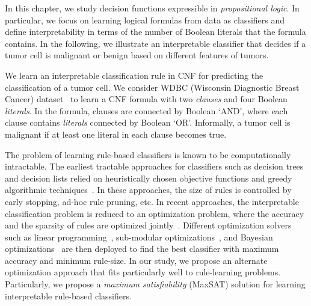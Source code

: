 In this chapter, we study decision functions expressible in \emph{propositional logic}. In particular, we focus on learning logical formulas from data as classifiers and define interpretability in terms of the number of Boolean literals that the formula contains. In the following, we illustrate an interpretable classifier that decides if a tumor cell is malignant or benign based on different features of tumors.

\vspace{1em}
\vspace{1em}


\begin{example}
	\normalfont
	We learn an interpretable classification rule in CNF for predicting the classification of a tumor cell. We consider WDBC (Wisconsin Diagnostic Breast Cancer) dataset~\cite{agarap2018breast} to learn a CNF formula with two \emph{clauses} and four Boolean \emph{literals}. In the formula, clauses are connected by Boolean `AND', where each clause contains \emph{literals} connected by Boolean `OR'. Informally, a tumor cell is malignant if at least one literal in each clause becomes true.
\end{example}



The problem of learning rule-based classifiers is known to be computationally intractable. The earliest tractable approaches for classifiers such as decision trees and decision lists relied on heuristically chosen objective functions and greedy algorithmic techniques~\cite{ClarkN1989,CohenS1999,quinlan2014}. In these approaches, the size of rules is controlled by early stopping,  ad-hoc rule pruning, etc. In recent approaches, the interpretable classification problem is reduced to an optimization problem, where the accuracy and the sparsity of rules are optimized jointly~\cite{lakkaraju2016interpretable,narodytska2018learning}. Different optimization solvers such as linear programming~\cite{malioutov2013exact}, sub-modular optimizations~\cite{lakkaraju2016interpretable}, and Bayesian optimizations~\cite{letham2015interpretable} are then deployed to find the best classifier with maximum accuracy and minimum rule-size. In our study, we propose an alternate optimization approach that fits particularly well to rule-learning problems. Particularly,  we propose a \textit{maximum satisfiability} (MaxSAT)  solution for learning interpretable rule-based classifiers. 

